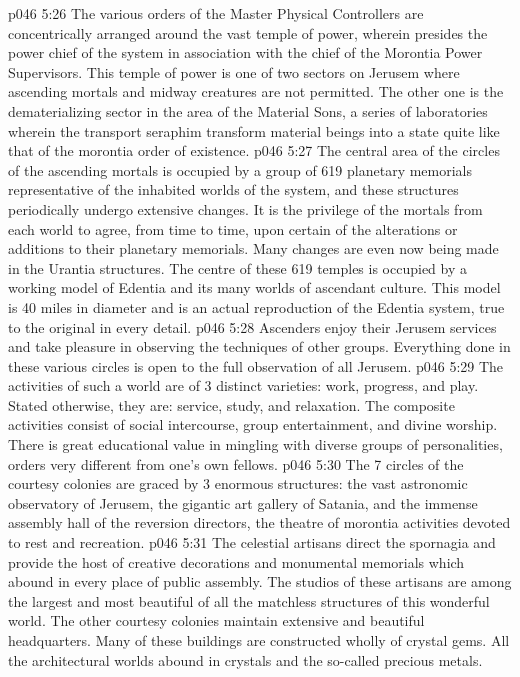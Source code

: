 \vs p046 5:26 \bibnobreakspace {} The various orders of the Master Physical Controllers are concentrically arranged around the vast temple of power, wherein presides the power chief of the system in association with the chief of the Morontia Power Supervisors. This temple of power is one of two sectors on Jerusem where ascending mortals and midway creatures are not permitted. The other one is the dematerializing sector in the area of the Material Sons, a series of laboratories wherein the transport seraphim transform material beings into a state quite like that of the morontia order of existence.
\vs p046 5:27 \bibnobreakspace {} The central area of the circles of the ascending mortals is occupied by a group of 619 planetary memorials representative of the inhabited worlds of the system, and these structures periodically undergo extensive changes. It is the privilege of the mortals from each world to agree, from time to time, upon certain of the alterations or additions to their planetary memorials. Many changes are even now being made in the Urantia structures. The centre of these 619 temples is occupied by a working model of Edentia and its many worlds of ascendant culture. This model is 40 miles in diameter and is an actual reproduction of the Edentia system, true to the original in every detail.
\vs p046 5:28 Ascenders enjoy their Jerusem services and take pleasure in observing the techniques of other groups. Everything done in these various circles is open to the full observation of all Jerusem.
\vs p046 5:29 The activities of such a world are of 3 distinct varieties: work, progress, and play. Stated otherwise, they are: service, study, and relaxation. The composite activities consist of social intercourse, group entertainment, and divine worship. There is great educational value in mingling with diverse groups of personalities, orders very different from one’s own fellows.
\vs p046 5:30 \bibnobreakspace {} The 7 circles of the courtesy colonies are graced by 3 enormous structures: the vast astronomic observatory of Jerusem, the gigantic art gallery of Satania, and the immense assembly hall of the reversion directors, the theatre of morontia activities devoted to rest and recreation.
\vs p046 5:31 The celestial artisans direct the spornagia and provide the host of creative decorations and monumental memorials which abound in every place of public assembly. The studios of these artisans are among the largest and most beautiful of all the matchless structures of this wonderful world. The other courtesy colonies maintain extensive and beautiful headquarters. Many of these buildings are constructed wholly of crystal gems. All the architectural worlds abound in crystals and the so\hyp{}called precious metals.
